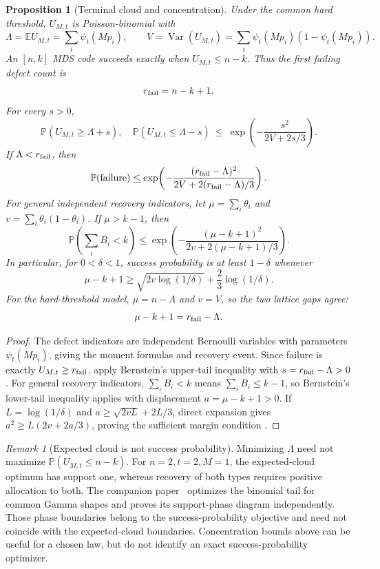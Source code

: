 \documentclass[11pt]{article}
\newtheorem{proposition}[theorem]{Proposition}
\theoremstyle{definition}
\theoremstyle{remark}
\newtheorem{remark}[theorem]{Remark}
\DeclareMathOperator{\Var}{Var}
\newcommand{\E}{\mathbb E}
\newcommand{\Pbb}{\mathbb P}
\newcommand{\1}{\mathbf 1}
\begin{document}
\begin{proposition}[Terminal cloud and concentration]\label{thm:terminal-cloud}
Under the common hard threshold, \(U_{M,t}\) is Poisson-binomial with
\[
 \Lambda=\E U_{M,t}=\sum_i\psi_t(Mp_i),\qquad
 V=\Var(U_{M,t})=\sum_i\psi_t(Mp_i)(1-\psi_t(Mp_i)).
\]
An \([n,k]\) MDS code succeeds exactly when \(U_{M,t}\le n-k\).
Thus the first failing defect count is
\[
 r_{\rm fail}=n-k+1.
\]
For every \(s>0\),
\[
 \Pbb(U_{M,t}\ge\Lambda+s),\quad
 \Pbb(U_{M,t}\le\Lambda-s)
 \ \le\ \exp\!\left(-\frac{s^2}{2V+2s/3}\right).
\]
If \(\Lambda<r_{\rm fail}\), then
\[
 \Pbb(\mathrm{failure})
 \le \exp\!\left(-\frac{(r_{\rm fail}-\Lambda)^2}
                         {2V+2(r_{\rm fail}-\Lambda)/3}\right).
\]
For general independent recovery indicators, let
\(\mu=\sum_i\theta_i\) and \(v=\sum_i\theta_i(1-\theta_i)\).
If \(\mu>k-1\), then
\[
 \Pbb\!\left(\sum_i B_i<k\right)
 \le\exp\!\left(-\frac{(\mu-k+1)^2}{2v+2(\mu-k+1)/3}\right).
\]
In particular, for \(0<\delta<1\), success probability is at least
\(1-\delta\) whenever
\[
 \mu-k+1\ge\sqrt{2v\log(1/\delta)}+\frac23\log(1/\delta).
\]
For the hard-threshold model, \(\mu=n-\Lambda\) and \(v=V\), so the
two lattice gaps agree:
\[
 \mu-k+1=r_{\rm fail}-\Lambda.
\]
\end{proposition}
\begin{proof}
The defect indicators are independent Bernoulli variables with
parameters \(\psi_t(Mp_i)\), giving the moment formulas and recovery
event.  Since failure is exactly \(U_{M,t}\ge r_{\rm fail}\), apply
Bernstein's upper-tail inequality with
\(s=r_{\rm fail}-\Lambda>0\).  For general recovery indicators,
\(\sum_i B_i<k\) means \(\sum_iB_i\le k-1\), so Bernstein's lower-tail
inequality applies with displacement \(a=\mu-k+1>0\).  If
\(L=\log(1/\delta)\) and \(a\ge\sqrt{2vL}+2L/3\), direct expansion
gives \(a^2\ge L(2v+2a/3)\), proving the sufficient margin condition
\cite[Chapter~2]{BoucheronLugosiMassart2013}.
\end{proof}

\begin{remark}[Expected cloud is not success probability]
Minimizing \(\Lambda\) need not maximize \(\Pbb(U_{M,t}\le n-k)\).
For \(n=2,t=2,M=1\), the expected-cloud optimum has support one,
whereas recovery of both types requires positive allocation to both.
The companion paper~\cite{LongGamma2026} optimizes the binomial tail
for common Gamma shapes and proves its support-phase diagram
independently. Those phase boundaries belong to the success-probability
objective and need not coincide with the expected-cloud boundaries.
Concentration bounds above can be useful for a chosen law, but do not
identify an exact success-probability optimizer.
\end{remark}
\end{document}
